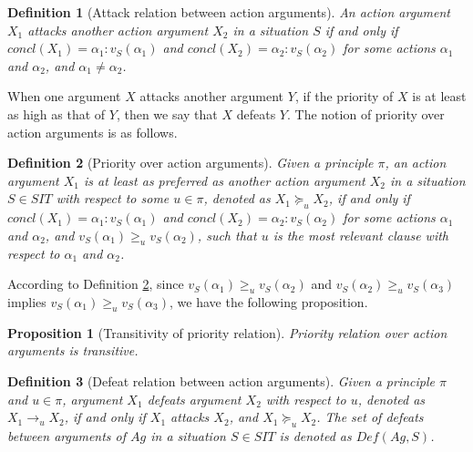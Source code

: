 \documentclass[letterpaper]{article} %
\newtheorem{definition}{Definition}
\newtheorem{proposition}{Proposition}
\begin{document}

\begin{definition}[Attack relation between action arguments]
An action argument $X_1$ attacks another action argument $X_2$ in a situation $S$ if and only if $concl(X_1) = \alpha_1: v_{S}(\alpha_1)$ and $concl(X_2) = \alpha_2: v_{S}(\alpha_2)$ for some actions $\alpha_1$ and $\alpha_2$, and $\alpha_1 \neq \alpha_2$. %
\end{definition}

When one argument $X$ attacks another argument $Y$, if the priority of $X$ is at least as high as that of $Y$, then we say that $X$ defeats $Y$. The notion of priority over action arguments is as follows. 

\begin{definition}[Priority over action arguments] \label{def-pri-arg}
 Given a principle $\pi$, an action argument $X_1$ is at least as preferred as another action argument $X_2$ in a situation $S\in SIT$ with respect to some $u\in \pi$, denoted as $X_1 \succeq_u X_2$,  if and only if $concl(X_1) = \alpha_1: v_{S}(\alpha_1)$ and $concl(X_2) = \alpha_2: v_{S}(\alpha_2)$ for some actions $\alpha_1$ and $\alpha_2$, and $v_{S}(\alpha_1) \ge_u v_{S}(\alpha_2)$, such that $u$ is the most relevant clause with respect to $\alpha_1$ and $\alpha_2$. 
\end{definition}

According to Definition \ref{def-pri-arg}, since $v_{S}(\alpha_1) \ge_u v_{S}(\alpha_2)$ and $v_{S}(\alpha_2) \ge_u v_{S}(\alpha_3)$ implies $v_{S}(\alpha_1) \ge_u v_{S}(\alpha_3)$,  we have the following proposition.

\begin{proposition}[Transitivity of priority relation]
Priority relation over action arguments is transitive. 
\end{proposition}
 
\begin{definition}[Defeat relation between action arguments]\label{def-defeat}
Given a principle $\pi$ and $u\in \pi$, argument $X_1$ defeats argument $X_2$ with respect to $u$, denoted as $X_1\rightarrow_u X_2$, if and only if $X_1$ attacks $X_2$, and $X_1 \succeq_u X_2$. The set of defeats between arguments of $Ag$ in a situation $S\in SIT$ is denoted as $Def(Ag, S)$. 
\end{definition}
\end{document}
